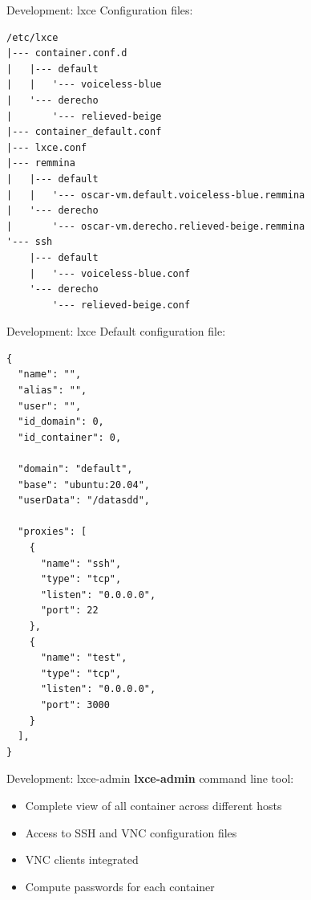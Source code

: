 \documentclass[10pt,english,handout,aspectradio=169]{beamer}
\begin{document}
\begin{frame}[fragile]{Development: lxce}
Configuration files:
\begin{verbatim}
/etc/lxce
|--- container.conf.d
|   |--- default
|   |   '--- voiceless-blue
|   '--- derecho
|       '--- relieved-beige
|--- container_default.conf
|--- lxce.conf
|--- remmina
|   |--- default
|   |   '--- oscar-vm.default.voiceless-blue.remmina
|   '--- derecho
|       '--- oscar-vm.derecho.relieved-beige.remmina
'--- ssh
    |--- default
    |   '--- voiceless-blue.conf
    '--- derecho
        '--- relieved-beige.conf
\end{verbatim}
\end{frame}
\begin{frame}[fragile]{Development: lxce}
Default configuration file:
\begin{verbatim}
{
  "name": "",
  "alias": "",
  "user": "",
  "id_domain": 0,
  "id_container": 0,
  
  "domain": "default",
  "base": "ubuntu:20.04",
  "userData": "/datasdd",
  
  "proxies": [
    {
      "name": "ssh",
      "type": "tcp",
      "listen": "0.0.0.0",
      "port": 22
    },
    {
      "name": "test",
      "type": "tcp",
      "listen": "0.0.0.0",
      "port": 3000
    }
  ],
}
\end{verbatim}
    
\end{frame}
\begin{frame}{Development: lxce-admin}
    \textbf{lxce-admin} command line tool:
    \begin{itemize}
        \item Complete view of all container across different hosts
        \item Access to SSH and VNC configuration files
        \item VNC clients integrated
        \item Compute passwords for each container
    \end{itemize}
\end{frame}
\end{document}
